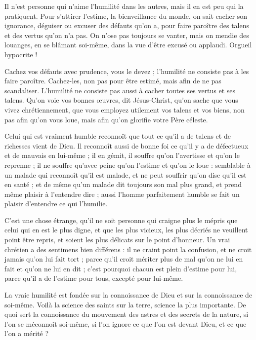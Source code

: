 \documentclass[instructions.tex]{subfiles}
\begin{document}
\secundo Il n’est personne qui n’aime l’humilité dans les autres, mais il en est peu qui la pratiquent. Pour s’attirer l’estime, la bienveillance du monde, on sait cacher son ignorance, déguiser ou excuser des défauts qu’on a, pour faire paroître des talens et des vertus qu’on n’a pas. On n’ose pas toujours se vanter, mais on mendie des louanges, en se blâmant soi-même, dans la vue d’être excusé ou applaudi. Orgueil hypocrite !
 
Cachez vos défauts avec prudence, vous le devez ; l’humilité ne consiste pas à les faire paroître. Cachez-les, non pas pour être estimé, mais afin de ne pas scandaliser. L’humilité ne consiste pas aussi à cacher toutes ses vertus et ses talens. Qu’on voie vos bonnes œuvres, dit Jésus-Christ, qu’on sache que vous vivez chrétiennement, que vous employez utilement vos talens et vos biens, non pas afin qu’on vous loue, mais afin qu’on glorifie votre Père céleste.
 
Celui qui est vraiment humble reconnoît que tout ce qu’il a de talens et de richesses vient de Dieu. Il reconnoît aussi de bonne foi ce qu’il y a de défectueux et de mauvais en lui-même ; il en gémit, il souffre qu’on l’avertisse et qu’on le reprenne ; il ne souffre qu’avec peine qu’on l’estime et qu’on le loue : semblable à un malade qui reconnoît qu’il est malade, et ne peut souffrir qu’on dise qu’il est en santé ; et de même qu’un malade dit toujours son mal plus grand, et prend même plaisir à l’entendre dire ; aussi l’homme parfaitement humble se fait un plaisir d’entendre ce qui l’humilie.
 
C’est une chose étrange, qu’il ne soit personne qui craigne plus le mépris que celui qui en est le plus digne, et que les plus vicieux, les plus décriés ne veuillent point être repris, et soient les plus délicats sur le point d’honneur. Un vrai chrétien a des sentimens bien différens : il ne craint point la confusion, et ne croit jamais qu’on lui fait tort ; parce qu’il croit mériter plus de mal qu’on ne lui en fait et qu’on ne lui en dit ; c’est pourquoi chacun est plein d’estime pour lui, parce qu’il a de l’estime pour tous, excepté pour lui-même.
 
\secundo La vraie humilité est fondée sur la connoissance de Dieu et sur la connoissance de soi-même. Voilà la science des saints sur la terre, science la plus importante. De quoi sert la connoissance du mouvement des astres et des secrets de la nature, si l’on se méconnoît soi-même, si l’on ignore ce que l’on est devant Dieu, et ce que l’on a mérité ?
 
\end{document}
